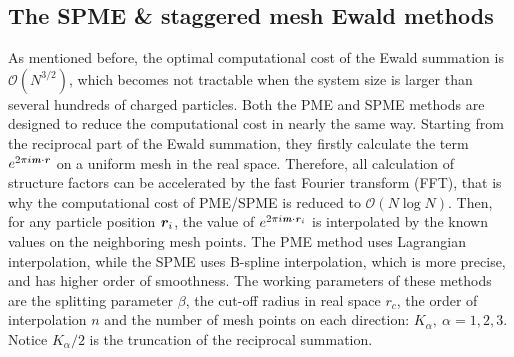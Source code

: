 \documentclass[aps,pre,preprint,unsortedaddress]{revtex4}
\newcommand{\redc}[1]{{\color{red} #1}}
\renewcommand{\v}[1]{\textbf{\textit{#1}}}
\begin{document}
\subsection{The SPME \&
staggered mesh Ewald methods}


As mentioned before, the 
optimal computational cost of the Ewald summation
is $\mathcal O(N^{3/2})$,
which becomes not \redc{tractable} when the system
size is larger than several hundreds of charged particles.
Both the PME \redc{and} SPME methods
are designed to reduce
the computational cost  in nearly the same
way.
Starting from the reciprocal part of the Ewald summation,
they firstly  calculate the term $e^{2\pi i\v m\cdot\v r}$ on a uniform
mesh in the real space.  Therefore, all calculation of structure factors
can be
accelerated by the fast Fourier transform (FFT), that is why the
computational cost of PME/SPME is reduced to $\mathcal O(N\log N)$. Then,
for any particle position $\v r_i$, the value of $e^{2\pi i\v m\cdot\v
  r_i}$ is interpolated by the known values on the neighboring mesh
points.  The PME method uses Lagrangian interpolation, while the SPME
uses B-spline interpolation,  which is more precise, and has higher order
of smoothness.
The working parameters of these methods are
the splitting parameter $\beta$,
the cut-off radius in real space $r_c$,
the order of interpolation $n$ and
the number of mesh points on each direction:  $K_\alpha,\ \alpha = 1,2,3$.
Notice $K_\alpha/2$ is the truncation
of the reciprocal summation.
\end{document}

